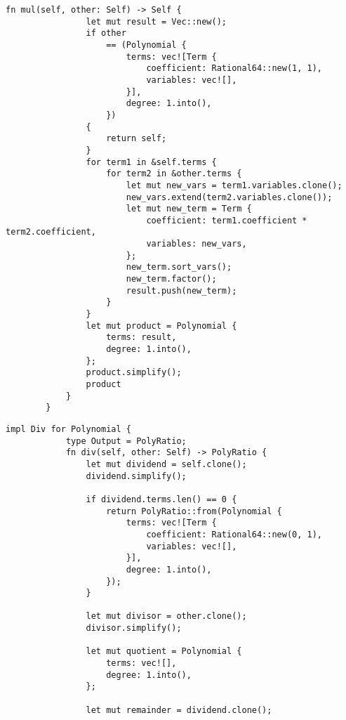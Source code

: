 {\begin{lstlisting}[caption={The implementation of the multiplication operation for the \texttt{Polynomial} struct}, label={lst:polynomial-mul}]
            fn mul(self, other: Self) -> Self {
                let mut result = Vec::new();
                if other
                    == (Polynomial {
                        terms: vec![Term {
                            coefficient: Rational64::new(1, 1),
                            variables: vec![],
                        }],
                        degree: 1.into(),
                    })
                {
                    return self;
                }
                for term1 in &self.terms {
                    for term2 in &other.terms {
                        let mut new_vars = term1.variables.clone();
                        new_vars.extend(term2.variables.clone());
                        let mut new_term = Term {
                            coefficient: term1.coefficient * term2.coefficient,
                            variables: new_vars,
                        };
                        new_term.sort_vars();
                        new_term.factor();
                        result.push(new_term);
                    }
                }
                let mut product = Polynomial {
                    terms: result,
                    degree: 1.into(),
                };
                product.simplify();
                product
            }
        }
    \end{lstlisting}
    
    \begin{lstlisting}[caption={The implementation of the division operation for the \texttt{Polynomial} struct}, label={lst:polynomial-div}]
        impl Div for Polynomial {
            type Output = PolyRatio;
            fn div(self, other: Self) -> PolyRatio {
                let mut dividend = self.clone();
                dividend.simplify();
        
                if dividend.terms.len() == 0 {
                    return PolyRatio::from(Polynomial {
                        terms: vec![Term {
                            coefficient: Rational64::new(0, 1),
                            variables: vec![],
                        }],
                        degree: 1.into(),
                    });
                }
        
                let mut divisor = other.clone();
                divisor.simplify();
        
                let mut quotient = Polynomial {
                    terms: vec![],
                    degree: 1.into(),
                };
        
                let mut remainder = dividend.clone();
        

\end{lstlisting}}
